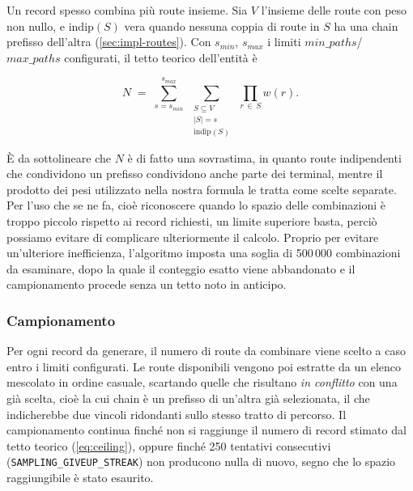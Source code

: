 \documentclass[12pt,a4paper,openright,twoside]{book}
\begin{document}
Un record spesso combina più route insieme. Sia $V$ l'insieme delle route con
peso non nullo, e $\mathrm{indip}(S)$ vera quando nessuna coppia di route in $S$
ha una chain prefisso dell'altra (\cref{sec:impl-routes}). Con
$\mathit{s_{\min}}$, $\mathit{s_{\max}}$ i limiti
$\mathit{min\_paths}$/$\mathit{max\_paths}$ configurati, il tetto teorico
dell'entità è

\begin{equation}
    \label{eq:ceiling}
    N \;=\; \sum_{s=\mathit{s_{\min}}}^{\mathit{s_{\max}}}
    \;\sum_{\substack{S \subseteq V \\ |S|=s \\ \mathrm{indip}(S)}}
    \;\prod_{r \,\in\, S} w(r).
\end{equation}

È da sottolineare che $N$ è di fatto una sovrastima, in quanto route
indipendenti che condividono un prefisso condividono anche parte dei terminal,
mentre il prodotto dei pesi utilizzato nella nostra formula le tratta come
scelte separate. Per l'uso che se ne fa, cioè riconoscere quando lo spazio delle
combinazioni è troppo piccolo rispetto ai record richiesti, un limite superiore
basta, perciò possiamo evitare di complicare ulteriormente il calcolo. Proprio
per evitare un'ulteriore inefficienza, l'algoritmo imposta una soglia di
500\,000 combinazioni da esaminare, dopo la quale il conteggio esatto viene
abbandonato e il campionamento procede senza un tetto noto in anticipo.

\subsubsection{Campionamento}
\label{sec:impl-sampling}

Per ogni record da generare, il numero di route da combinare viene scelto a caso
entro i limiti configurati. Le route disponibili vengono poi estratte da un
elenco mescolato in ordine casuale, scartando quelle che risultano \emph{in
    conflitto} con una già scelta, cioè la cui chain è un prefisso di un'altra già
selezionata, il che indicherebbe due vincoli ridondanti sullo stesso tratto di
percorso. Il campionamento continua finché non si raggiunge il numero di record
stimato dal tetto teorico (\cref{eq:ceiling}), oppure finché 250 tentativi
consecutivi (\texttt{SAMPLING\_GIVEUP\_STREAK}) non producono nulla di nuovo,
segno che lo spazio raggiungibile è stato esaurito.
\end{document}
